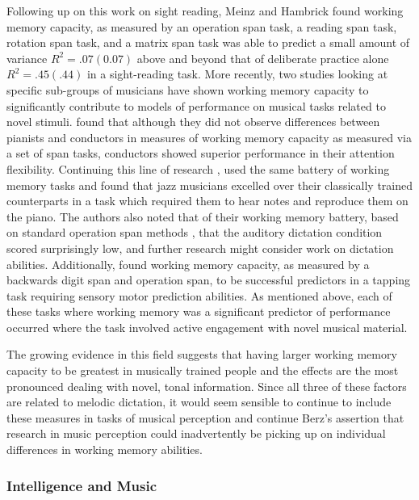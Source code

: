 \documentclass[12pt,]{book}
\begin{document}
Following up on this work on sight reading, Meinz and Hambrick \citep{meinzDeliberatePracticeNecessary2010} found working memory capacity, as measured by an operation span task, a reading span task, rotation span task, and a matrix span task was able to predict a small amount of variance \(R^2=.07 (0.07)\) above and beyond that of deliberate practice alone \(R^2=.45 (.44)\) in a sight-reading task.
More recently, two studies looking at specific sub-groups of musicians have shown working memory capacity to significantly contribute to models of performance on musical tasks related to novel stimuli.
\citet{wollnerAttentionalFlexibilityMemory2016} found that although they did not observe differences between pianists and conductors in measures of working memory capacity as measured via a set of span tasks, conductors showed superior performance in their attention flexibility.
Continuing this line of research \citet{nicholsScoreOneJazz2018}, used the same battery of working memory tasks and found that jazz musicians excelled over their classically trained counterparts in a task which required them to hear notes and reproduce them on the piano.
The authors also noted that of their working memory battery, based on standard operation span methods \citep{engleWorkingMemoryCapacity2002}, that the auditory dictation condition scored surprisingly low, and further research might consider work on dictation abilities.
Additionally, \citet{colleyWorkingMemoryAuditory2017} found working memory capacity, as measured by a backwards digit span and operation span, to be successful predictors in a tapping task requiring sensory motor prediction abilities.
As mentioned above, each of these tasks where working memory was a significant predictor of performance occurred where the task involved active engagement with novel musical material.

The growing evidence in this field suggests that having larger working memory capacity to be greatest in musically trained people and the effects are the most pronounced dealing with novel, tonal information.
Since all three of these factors are related to melodic dictation, it would seem sensible to continue to include these measures in tasks of musical perception and continue Berz's assertion that research in music perception could inadvertently be picking up on individual differences in working memory abilities.

\hypertarget{intelligence-and-music}{%
\subsubsection{Intelligence and Music}\label{intelligence-and-music}}
\end{document}
